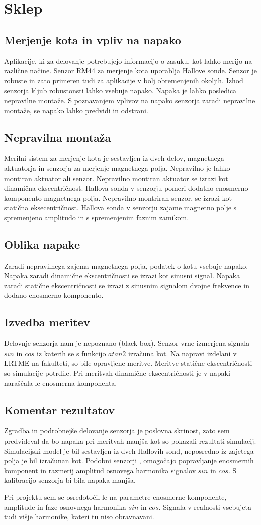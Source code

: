 \chapter{Sklep}
\section{Merjenje kota in vpliv na napako}
Aplikacije, ki za delovanje potrebujejo informacijo o zasuku, kot lahko merijo na različne načine. Senzor RM44 za merjenje kota uporablja Hallove sonde. Senzor je robuste in zato primeren tudi za aplikacije v bolj obremenjenih okoljih. Izhod senzorja kljub robustonsti lahko vsebuje napako. Napaka je lahko posledica nepravilne montaže. S poznavanjem vplivov na napako senzorja zaradi nepravilne montaže, se napako lahko predvidi in odstrani.
\section{Nepravilna montaža}
Merilni sistem za merjenje kota je sestavljen iz dveh delov, magnetnega aktuatorja in senzorja za merjenje magnetnega polja. Nepravilno je lahko montiran aktuator ali senzor. Nepravilno montiran aktuator se izrazi kot dinamična ekscentričnost. Hallova sonda v senzorju pomeri dodatno enosmerno komponento magnetnega polja.
Nepravilno montriran senzor, se izrazi kot statična eksecentričnost. Hallova sonda v senzorju zajame magnetno polje s spremenjeno amplitudo in s spremenjenim faznim zamikom.
\section{Oblika napake}
Zaradi nepravilnega zajema magnetnega polja, podatek o kotu vsebuje napako. Napaka zaradi dinamične ekscentričnosti se izrazi kot sinusni signal. Napaka zaradi statične ekscentričnosti se izrazi z sinusnim signalom dvojne frekvence in dodano enosmerno komponento.
\section{Izvedba meritev}
Delovnje senzorja nam je nepoznano (black-box). Senzor vrne izmerjena signala $sin$ in $cos$ iz katerih se s funkcijo $atan2$ izračuna kot. Na napravi izdelani v LRTME na fakulteti, so bile opravljene meritve. Meritve statične ekscentričnosti so simulacije potrdile. Pri meritvah dinamične ekscentričnosti je v napaki naraščala le enosmerna komponenta.
\section{Komentar rezultatov}
Zgradba in podrobnejše delovanje senzorja je poslovna skrinost, zato sem predvideval da bo napaka pri meritvah manjša kot so pokazali rezultati simulacij. Simulacijski model je bil sestavljen iz dveh Hallovih sond, neposredno iz zajetega polja je bil izračunan kot. 
Podobni senzorji \cite{iCMHM}, omogočajo popravljanje enosmernih komponent in razmerij amplitud osnovega harmonika signalov $sin$ in $cos$. S kalibracijo senzorja bi bila napaka manjša.

Pri projektu sem se osredotočil le na parametre enosmerne komponente, amplitude in faze osnovnega harmonika $sin$ in $cos$. Signala v realnosti vsebujeta tudi višje harmonike, kateri tu niso obravnavani.



